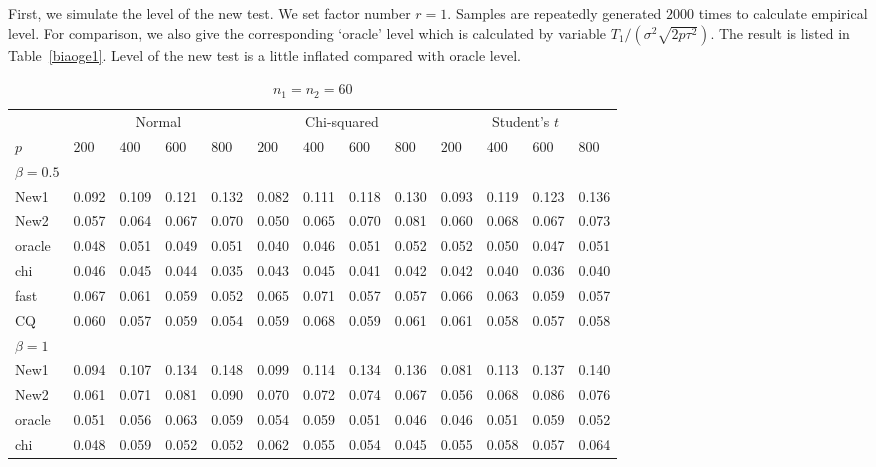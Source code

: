 \documentclass[review]{elsarticle}
\theoremstyle{plain}
\theoremstyle{definition}
\theoremstyle{remark}
\begin{document}
First, we simulate the level of the new test. We set factor number $r=1$.
Samples are repeatedly generated $2000$ times to calculate empirical level.
For comparison, we also give the corresponding `oracle' level which is calculated by variable ${T_1}/(\sigma^2\sqrt{2p\tau^2})$.
The result is listed in
Table~\ref{biaoge1}.
Level of the new test is a little inflated compared with oracle level.

\begin{table}[ht]
\caption{$n_1=n_2=60$} 
\label{hahaha}
\vspace{3mm}
\centering
\begin{tabular}{lllllllllllll}
\toprule
    &   \multicolumn{4}{c}{Normal} & \multicolumn{4}{c}{Chi-squared}& \multicolumn{4}{c}{Student's $t$}  \\
    \cmidrule(r){2-5}
\cmidrule(r){6-9}
\cmidrule(r){10-13}
    $p$ & $200$ & $400$ & $600$ & $800$ & $200$ & $400$ & $600$ & $800$ & $200$ & $400$ & $600$ & $800$ \\ 
\midrule
    $\beta=0.5$\\
New1 & 0.092 & 0.109 & 0.121 & 0.132 & 0.082 & 0.111 & 0.118 & 0.130 & 0.093 & 0.119 & 0.123 & 0.136 \\ 
New2 & 0.057 & 0.064 & 0.067 & 0.070 & 0.050 & 0.065 & 0.070 & 0.081 & 0.060 & 0.068 & 0.067 & 0.073 \\ 
oracle & 0.048 & 0.051 & 0.049 & 0.051 & 0.040 & 0.046 & 0.051 & 0.052 & 0.052 & 0.050 & 0.047 & 0.051 \\ 
chi & 0.046 & 0.045 & 0.044 & 0.035 & 0.043 & 0.045 & 0.041 & 0.042 & 0.042 & 0.040 & 0.036 & 0.040 \\ 
fast & 0.067 & 0.061 & 0.059 & 0.052 & 0.065 & 0.071 & 0.057 & 0.057 & 0.066 & 0.063 & 0.059 & 0.057 \\ 
CQ & 0.060 & 0.057 & 0.059 & 0.054 & 0.059 & 0.068 & 0.059 & 0.061 & 0.061 & 0.058 & 0.057 & 0.058 \\ 
    $\beta=1$\\
New1 & 0.094 & 0.107 & 0.134 & 0.148 & 0.099 & 0.114 & 0.134 & 0.136 & 0.081 & 0.113 & 0.137 & 0.140 \\ 
New2 & 0.061 & 0.071 & 0.081 & 0.090 & 0.070 & 0.072 & 0.074 & 0.067 & 0.056 & 0.068 & 0.086 & 0.076 \\ 
oracle & 0.051 & 0.056 & 0.063 & 0.059 & 0.054 & 0.059 & 0.051 & 0.046 & 0.046 & 0.051 & 0.059 & 0.052 \\ 
chi & 0.048 & 0.059 & 0.052 & 0.052 & 0.062 & 0.055 & 0.054 & 0.045 & 0.055 & 0.058 & 0.057 & 0.064 \\ 

\end{tabular}
\end{table}
\end{document}
